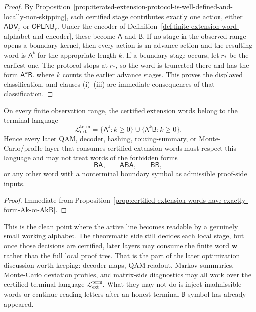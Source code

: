 \begin{proof}
By Proposition~\ref{prop:iterated-extension-protocol-is-well-defined-and-locally-non-skipping}, each certified stage contributes exactly one action, either \(\mathsf{ADV}_r\) or \(\mathsf{OPENB}_r\). Under the encoder of Definition~\ref{def:finite-extension-word-alphabet-and-encoder}, these become \(\mathsf A\) and \(\mathsf B\). If no stage in the observed range opens a boundary kernel, then every action is an advance action and the resulting word is \(\mathsf A^k\) for the appropriate length \(k\). If a boundary stage occurs, let \(r_*\) be the earliest one. The protocol stops at \(r_*\), so the word is truncated there and has the form \(\mathsf A^k\mathsf B\), where \(k\) counts the earlier advance stages. This proves the displayed classification, and clauses (i)--(iii) are immediate consequences of that classification.
\end{proof}

\begin{corollary}
\label{cor:extension-protocol-defines-regular-terminal-word-language}
On every finite observation range, the certified extension words belong to the terminal language
\[
 \mathcal L_{\mathrm{ext}}^{\mathrm{term}}
 =
 \{\mathsf A^k : k\ge 0\}
 \cup
 \{\mathsf A^k\mathsf B : k\ge 0\}.
\]
Hence every later QAM, decoder, hashing, routing-summary, or Monte-Carlo/profile layer that consumes certified extension words must respect this language and may not treat words of the forbidden forms
\[
 \mathsf B\mathsf A,\qquad \mathsf A\mathsf B\mathsf A,\qquad \mathsf B\mathsf B,
\]
or any other word with a nonterminal boundary symbol as admissible proof-side inputs.
\end{corollary}

\begin{proof}
Immediate from Proposition~\ref{prop:certified-extension-words-have-exactly-form-Ak-or-AkB}.
\end{proof}

\begin{remark}
\label{rem:what-this-word-form-now-buys}
This is the clean point where the active line becomes readable by a genuinely small working alphabet. The theorematic side still decides each local stage, but once those decisions are certified, later layers may consume the finite word \(\mathbf w\) rather than the full local proof tree. That is the part of the later optimization discussion worth keeping: decoder maps, QAM readout, Markov summaries, Monte-Carlo deviation profiles, and matrix-side diagnostics may all work over the certified terminal language \(\mathcal L_{\mathrm{ext}}^{\mathrm{term}}\). What they may not do is inject inadmissible words or continue reading letters after an honest terminal \(\mathsf B\)-symbol has already appeared.
\end{remark}



